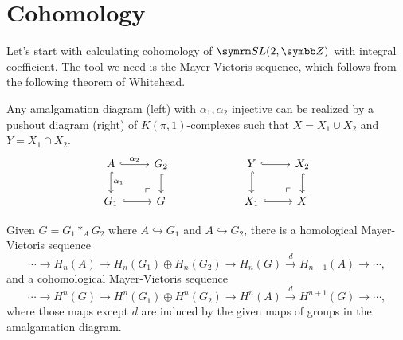 \section{Cohomology}

Let's start with calculating cohomology of $\SLtZ$ with integral coefficient. The tool we need is the Mayer-Vietoris sequence, which follows from the following theorem of Whitehead.

\begin{theorem}[Whitehead]
  Any amalgamation diagram (left) with $\alpha_1, \alpha_2$ injective can be realized by a pushout diagram (right) of $K(\pi, 1)$-complexes such that $X=X_1\cup X_2$ and $Y=X_1\cap X_2$.
  \begin{equation*}
    \begin{tikzcd}
      A & G_2\\
      G_1 & G
      \arrow[from=1-1,hook,]{1-2}[]{\alpha_2}
      \arrow[from=2-1,hook,]{2-2}[]{}
      \arrow[from=1-1,hook,]{2-1}[]{\alpha_1}
      \arrow[from=1-2,hook,]{2-2}[]{}
      \arrow[from=1-1,phantom,]{2-2}[very near end,]{\ulcorner}
    \end{tikzcd}
    \qquad\qquad\qquad
    \begin{tikzcd}
      Y & X_2\\
      X_1 & X
      \arrow[from=1-1,hook,]{1-2}[]{}
      \arrow[from=2-1,hook,]{2-2}[]{}
      \arrow[from=1-1,hook,]{2-1}[]{}
      \arrow[from=1-2,hook,]{2-2}[]{}
      \arrow[from=1-1,phantom,]{2-2}[very near end,]{\ulcorner}
    \end{tikzcd}
  \end{equation*}
\end{theorem}

\begin{corollary}
  Given $G=G_1\ast_{A}G_2$ where $A\hookrightarrow G_1$ and $A\hookrightarrow G_2$, there is a homological Mayer-Vietoris sequence
  \begin{equation*}
    \dotsb\to H_n(A)\to H_n(G_1)\oplus H_n(G_2)\to H_n(G)\xrightarrow{d} H_{n-1}(A)\to\dotsb,
  \end{equation*}
  and a cohomological Mayer-Vietoris sequence
  \begin{equation*}
    \dotsb\to H^n(G)\to H^n(G_1)\oplus H^n(G_2)\to H^n(A)\xrightarrow{d} H^{n+1}(G)\to\dotsb,
  \end{equation*}
  where those maps except $d$ are induced by the given maps of groups in the amalgamation diagram.
\end{corollary}

